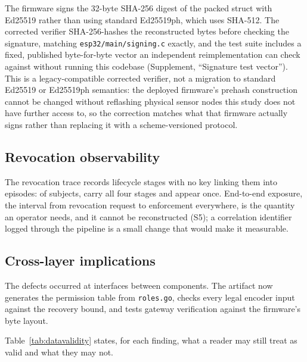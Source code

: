 \documentclass[a4paper,fleqn]{cas-sc}
\begin{document}
The firmware signs the 32-byte SHA-256 digest of the packed struct with
Ed25519 rather than using standard Ed25519ph, which uses SHA-512.
The corrected verifier SHA-256-hashes the reconstructed bytes
before checking the signature, matching \texttt{esp32/main/signing.c}
exactly, and the test suite includes a fixed, published byte-for-byte
vector an independent reimplementation can check against without running
this codebase (Supplement, ``Signature test vector''). This is a
legacy-compatible corrected verifier, not a migration to standard
Ed25519 or Ed25519ph semantics: the deployed firmware's prehash
construction cannot be changed without reflashing physical sensor nodes
this study does not have further access to, so the correction matches
what that firmware actually signs rather than replacing it with a
scheme-versioned protocol.

\subsection{Revocation observability}
\label{subsec:pm_revocation}

The revocation trace records lifecycle stages with no key linking them
into episodes: of \RevSubjects{} subjects, \RevComplete{} carry all four
stages and \RevSingleStage{} appear once. End-to-end exposure, the
interval from revocation request to enforcement everywhere, is the
quantity an operator needs, and it cannot be reconstructed (S5); a
correlation identifier logged through the pipeline is a small change that
would make it measurable.

\subsection{Cross-layer implications}
\label{subsec:pm_pattern}

The defects occurred at interfaces between components. The artifact now
generates the permission table from \texttt{roles.go}, checks every legal
encoder input against the recovery bound, and tests gateway verification
against the firmware's byte layout.

Table~\ref{tab:datavalidity} states, for each finding, what a reader may
still treat as valid and what they may not.
\end{document}
